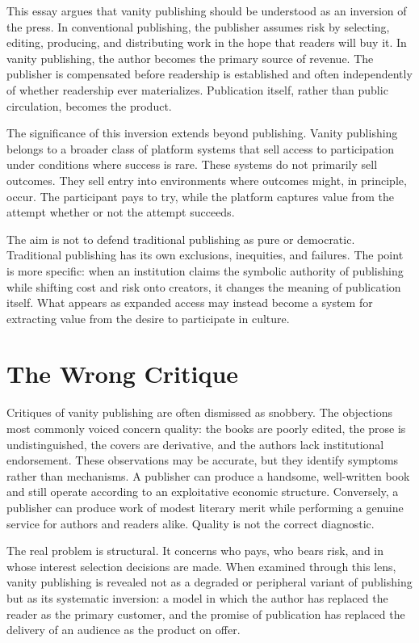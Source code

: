 \documentclass[12pt, a4paper]{article}
\begin{document}
This essay argues that vanity publishing should be understood as an inversion of the press. In conventional publishing, the publisher assumes risk by selecting, editing, producing, and distributing work in the hope that readers will buy it. In vanity publishing, the author becomes the primary source of revenue. The publisher is compensated before readership is established and often independently of whether readership ever materializes. Publication itself, rather than public circulation, becomes the product.

The significance of this inversion extends beyond publishing. Vanity publishing belongs to a broader class of platform systems that sell access to participation under conditions where success is rare. These systems do not primarily sell outcomes. They sell entry into environments where outcomes might, in principle, occur. The participant pays to try, while the platform captures value from the attempt whether or not the attempt succeeds.

The aim is not to defend traditional publishing as pure or democratic. Traditional publishing has its own exclusions, inequities, and failures. The point is more specific: when an institution claims the symbolic authority of publishing while shifting cost and risk onto creators, it changes the meaning of publication itself. What appears as expanded access may instead become a system for extracting value from the desire to participate in culture.

\section{The Wrong Critique}

Critiques of vanity publishing are often dismissed as snobbery. The objections most commonly voiced concern quality: the books are poorly edited, the prose is undistinguished, the covers are derivative, and the authors lack institutional endorsement. These observations may be accurate, but they identify symptoms rather than mechanisms. A publisher can produce a handsome, well-written book and still operate according to an exploitative economic structure. Conversely, a publisher can produce work of modest literary merit while performing a genuine service for authors and readers alike. Quality is not the correct diagnostic.

The real problem is structural. It concerns who pays, who bears risk, and in whose interest selection decisions are made. When examined through this lens, vanity publishing is revealed not as a degraded or peripheral variant of publishing but as its systematic inversion: a model in which the author has replaced the reader as the primary customer, and the promise of publication has replaced the delivery of an audience as the product on offer.
\end{document}
